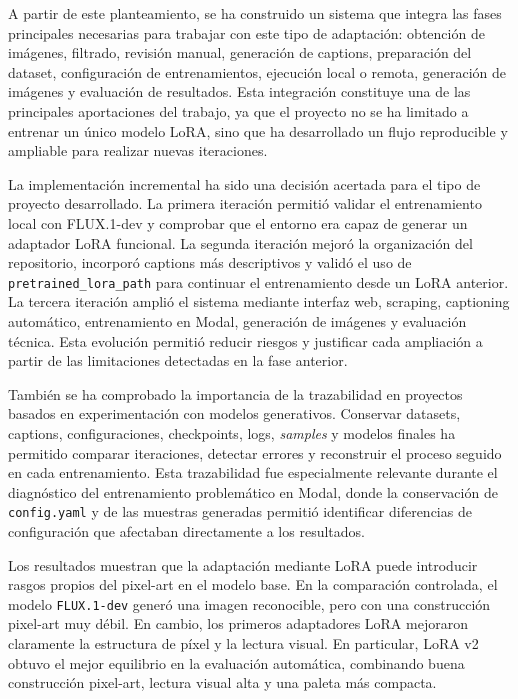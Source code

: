 \documentclass[a4paper,11pt,titlepage]{scrbook}
\begin{document}
\medskip

A partir de este planteamiento, se ha construido un sistema que integra las fases principales necesarias para trabajar con este tipo de adaptación: obtención de imágenes, filtrado, revisión manual, generación de captions, preparación del dataset, configuración de entrenamientos, ejecución local o remota, generación de imágenes y evaluación de resultados. Esta integración constituye una de las principales aportaciones del trabajo, ya que el proyecto no se ha limitado a entrenar un único modelo LoRA, sino que ha desarrollado un flujo reproducible y ampliable para realizar nuevas iteraciones.

\medskip

La implementación incremental ha sido una decisión acertada para el tipo de proyecto desarrollado. La primera iteración permitió validar el entrenamiento local con FLUX.1-dev y comprobar que el entorno era capaz de generar un adaptador LoRA funcional. La segunda iteración mejoró la organización del repositorio, incorporó captions más descriptivos y validó el uso de \texttt{pretrained_lora_path} para continuar el entrenamiento desde un LoRA anterior. La tercera iteración amplió el sistema mediante interfaz web, scraping, captioning automático, entrenamiento en Modal, generación de imágenes y evaluación técnica. Esta evolución permitió reducir riesgos y justificar cada ampliación a partir de las limitaciones detectadas en la fase anterior.

\medskip

También se ha comprobado la importancia de la trazabilidad en proyectos basados en experimentación con modelos generativos. Conservar datasets, captions, configuraciones, checkpoints, logs, \textit{samples} y modelos finales ha permitido comparar iteraciones, detectar errores y reconstruir el proceso seguido en cada entrenamiento. Esta trazabilidad fue especialmente relevante durante el diagnóstico del entrenamiento problemático en Modal, donde la conservación de \texttt{config.yaml} y de las muestras generadas permitió identificar diferencias de configuración que afectaban directamente a los resultados.

\medskip

Los resultados muestran que la adaptación mediante LoRA puede introducir rasgos propios del pixel-art en el modelo base. En la comparación controlada, el modelo \texttt{FLUX.1-dev} generó una imagen reconocible, pero con una construcción pixel-art muy débil. En cambio, los primeros adaptadores LoRA mejoraron claramente la estructura de píxel y la lectura visual. En particular, LoRA v2 obtuvo el mejor equilibrio en la evaluación automática, combinando buena construcción pixel-art, lectura visual alta y una paleta más compacta.
\end{document}
